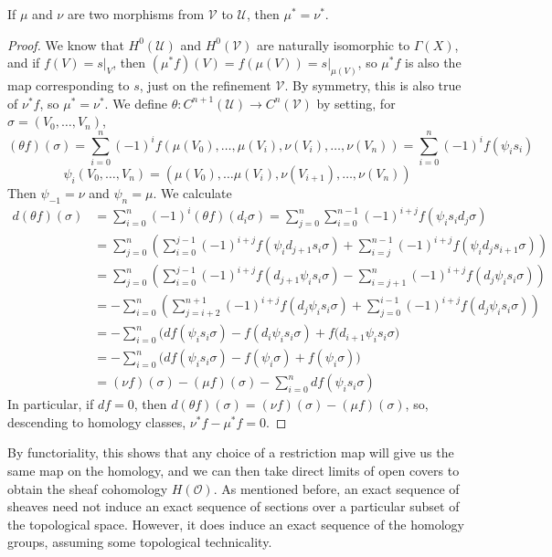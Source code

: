 \begin{lemma}
    If $\mu$ and $\nu$ are two morphisms from $\mathcal{V}$ to $\mathcal{U}$, then $\mu^* = \nu^*$.
\end{lemma}
\begin{proof}
    We know that $H^0(\mathcal{U})$ and $H^0(\mathcal{V})$ are naturally isomorphic to $\Gamma(X)$, and if $f(V) = s|_V$, then $(\mu^* f)(V) = f(\mu(V)) = s|_{\mu(V)}$, so $\mu^* f$ is also the map corresponding to $s$, just on the refinement $\mathcal{V}$. By symmetry, this is also true of $\nu^* f$, so $\mu^* = \nu^*$. We define $\theta: C^{n+1}(\mathcal{U}) \to C^n(\mathcal{V})$ by setting, for $\sigma = (V_0, \dots, V_n)$,
    \[ (\theta f)(\sigma) = \sum_{i = 0}^n (-1)^i f(\mu(V_0), \dots, \mu(V_i), \nu(V_i), \dots, \nu(V_n)) = \sum_{i = 0}^n (-1)^i f(\psi_i s_i) \]
    \[ \psi_i(V_0, \dots, V_n) = (\mu(V_0), \dots \mu(V_i), \nu(V_{i+1}), \dots, \nu(V_n)) \]
    Then $\psi_{-1} = \nu$ and $\psi_n = \mu$. We calculate
    \begin{align*}
        d(\theta f)(\sigma) &= \sum_{i = 0}^n (-1)^i (\theta f)(d_i \sigma) = \sum_{j = 0}^n \sum_{i = 0}^{n-1} (-1)^{i+j} f(\psi_i s_i d_j \sigma)\\
        &= \sum_{j = 0}^n \left( \sum_{i = 0}^{j-1} (-1)^{i+j} f(\psi_i d_{j+1} s_i \sigma) + \sum_{i = j}^{n-1} (-1)^{i+j} f(\psi_i d_j s_{i+1} \sigma) \right)\\
        &= \sum_{j = 0}^n \left( \sum_{i = 0}^{j-1} (-1)^{i+j} f(d_{j+1} \psi_i s_i \sigma) - \sum_{i = j +1}^n (-1)^{i+j} f(d_j \psi_i s_i \sigma) \right)\\
        &= - \sum_{i = 0}^n \left( \sum_{j = i+2}^{n+1} (-1)^{i+j} f(d_j \psi_i s_i \sigma) + \sum_{j = 0}^{i-1} (-1)^{i+j} f(d_j \psi_i s_i \sigma) \right)\\
        &= - \sum_{i = 0}^n \bigg( df(\psi_i s_i \sigma) - f(d_i \psi_i s_i \sigma) + f(d_{i+1} \psi_i s_i \sigma \bigg)\\
        &= - \sum_{i = 0}^n \bigg( df(\psi_i s_i \sigma) - f(\psi_i \sigma) + f(\psi_i \sigma) \bigg)\\
        &= (\nu f)(\sigma) - (\mu f)(\sigma) - \sum_{i = 0}^n df(\psi_i s_i \sigma)
    \end{align*}
    In particular, if $df = 0$, then $d(\theta f)(\sigma) = (\nu f)(\sigma) - (\mu f)(\sigma)$, so, descending to homology classes, $\nu^* f - \mu^* f = 0$.
\end{proof}

By functoriality, this shows that any choice of a restriction map will give us the same map on the homology, and we can then take direct limits of open covers to obtain the sheaf cohomology $H(\mathcal{O})$. As mentioned before, an exact sequence of sheaves need not induce an exact sequence of sections over a particular subset of the topological space. However, it does induce an exact sequence of the homology groups, assuming some topological technicality.

